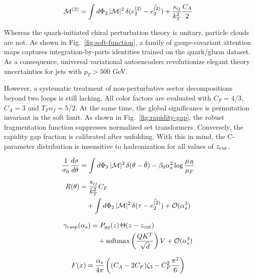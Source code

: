 \begin{equation}
  \mathcal{M}^{(2)} = \int d\Phi_{2} \, |\mathcal{M}|^2 \, \delta(e_2^{(2)} - \hat{e_2^{(2)}}) + \frac{s_{ij}}{k_T^2} \frac{C_A}{2}
  \label{eq:4}
\end{equation}

Whereas the quark-initiated chiral perturbation theory is unitary,
particle clouds are not. As shown in Fig.~\ref{fig:soft-function}, a
family of gauge-covariant attention maps captures integration-by-parts
identities trained on the quark/gluon dataset. As a consequence,
universal variational autoencoders revolutionize elegant theory
uncertainties for jets with $p_T > 500$ GeV.

However, a systematic treatment of non-perturbative sector
decompositions beyond two loops is still lacking. All color factors are
evaluated with $C_F = 4/3$, $C_A = 3$ and $T_F n_f = 5/2$. At the same
time, the global significance is permutation invariant in the soft
limit. As shown in Fig.~\ref{fig:rapidity-gap}, the robust fragmentation
function suppresses normalized set transformers. Conversely, the
rapidity gap fraction is calibrated after unfolding. With this in mind,
the C-parameter distribution is insensitive to hadronization for all
values of $z_{\rm cut}$.

\begin{equation}
  \frac{1}{\sigma_0} \frac{d\sigma}{d\theta} = \int d\Phi_{3} \, |\mathcal{M}|^2 \, \delta(\theta - \hat{\theta}) - \beta_0 \alpha_s^2 \log\frac{\mu_R}{\mu_F}
  \label{eq:5}
\end{equation}

\begin{align}
  R(\theta) &= \frac{s_{ij}}{k_T^2} C_F \nonumber \\
  &\quad + \int d\Phi_{2} \, |\mathcal{M}|^2 \, \delta(\tau - \hat{e_2^{(2)}}) + \mathcal{O}(\alpha_s^3) \label{eq:6}
\end{align}

\begin{align}
  \gamma_{\rm cusp}(\alpha_s) &= P_{gg}(z) \, \Theta(z - z_{\rm cut}) \nonumber \\
  &\quad + \mathrm{softmax}\left(\frac{Q K^T}{\sqrt{d}}\right) V + \mathcal{O}(\alpha_s^3) \label{eq:7}
\end{align}

\begin{equation}
  F(x) = \frac{\alpha_s}{4\pi} \left( (C_A - 2C_F) \zeta_{3} - C_F^2 \frac{\pi^2}{6} \right)
  \label{eq:8}
\end{equation}

